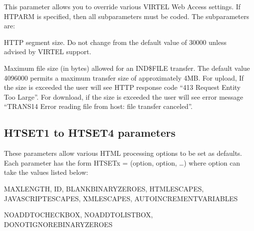 \documentclass[letterpaper,10pt,english]{sphinxmanual}
\begin{document}
\sphinxAtStartPar
This parameter allows you to override various VIRTEL Web Access settings. If HTPARM is specified, then all subparameters must be coded. The sub\sphinxhyphen{}parameters are:

\sphinxAtStartPar
{} \sphinxhyphen{} HTTP segment size. Do not change from the default value of 30000 unless advised by VIRTEL support.

\sphinxAtStartPar
{} \sphinxhyphen{} Maximum file size (in bytes) allowed for an IND\$FILE transfer. The default value 4096000 permits a maximum transfer size of approximately 4MB. For upload, If the size is exceeded the user will see HTTP response code “413 Request Entity Too Large”. For download, if the size is exceeded the user will see error message “TRANS14 Error reading file from host: file transfer canceled”.

\ignorespaces 

\subsection{HTSET1 to HTSET4 parameters}
\label{\detokenize{Installation_Guide:htset1-to-htset4-parameters}}\label{\detokenize{Installation_Guide:index-80}}
\begin{sphinxVerbatim}[commandchars=\\\{\}]
          
\end{sphinxVerbatim}

\sphinxAtStartPar
These parameters allow various HTML processing options to be set as defaults. Each parameter has the form HTSETx = (option, option, …) where option can take the values listed below:

\sphinxAtStartPar
{} \sphinxhyphen{} MAXLENGTH, ID, BLANK\sphinxhyphen{}BINARY\sphinxhyphen{}ZEROES, HTML\sphinxhyphen{}ESCAPES, JAVASCRIPT\sphinxhyphen{}ESCAPES, XML\sphinxhyphen{}ESCAPES, AUTO\sphinxhyphen{}INCREMENTVARIABLES

\sphinxAtStartPar
{} \sphinxhyphen{} NO\sphinxhyphen{}ADD\sphinxhyphen{}TO\sphinxhyphen{}CHECKBOX, NO\sphinxhyphen{}ADD\sphinxhyphen{}TO\sphinxhyphen{}LISTBOX, DO\sphinxhyphen{}NOT\sphinxhyphen{}IGNORE\sphinxhyphen{}BINARY\sphinxhyphen{}ZEROES
\end{document}
